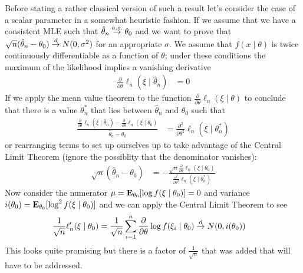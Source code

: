 Before stating a rather classical version of such a result let's consider the
case of a scalar parameter in a somewhat heuristic fashion.  If we
assume that we have a consistent MLE such that $\hat{\theta}_n \toas
\theta_0$ and we want to prove that $\sqrt{n}(\hat{\theta}_n -
\theta_0 ) \todist N(0, \sigma^2)$ for an appropriate $\sigma$.  We assume that $f(x \mid
\theta)$ is twice continuously differentiable as a function of
$\theta$; under these conditions the
maximum of the likelihood implies a vanishing derivative
\begin{align*}
\frac{\partial}{\partial \theta} \ell_n (\xi \mid \hat{\theta}_n) &= 0
\end{align*} 
If we apply the mean value theorem to the function
$\frac{\partial}{\partial \theta} \ell_n (\xi \mid \theta)$ to conclude
that there is a value $\theta^*_n$ that lies between $\hat{\theta}_n$
and $\theta_0$ such that 
\begin{align*}
\frac{\frac{\partial}{\partial \theta} \ell_n (\xi \mid \hat{\theta}_n)
  - \frac{\partial}{\partial \theta} \ell_n (\xi \mid
  \theta_0)}{\hat{\theta}_n - \theta_0} &= \frac{\partial^2}{\partial \theta^2}\ell_n (\xi \mid \theta^*_n)
\end{align*}
or rearranging terms to set up ourselves up to take advantage of the
Central Limit Theorem (ignore the possiblity that the denominator vanishes):
\begin{align*}
\sqrt{n}(\hat{\theta}_n - \theta_0) &=
-\frac{\sqrt{n}
 \frac{\partial}{\partial \theta} \ell_n (\xi \mid
  \theta_0)}{\frac{\partial^2}{\partial \theta^2}\ell_n (\xi \mid \theta^*_n)} 
\end{align*}
Now consider the numerator $\mu = \sexpectation{\log f(\xi \mid
  \theta_0)}{\theta_0} = 0$ and variance $i(\theta_0) = \sexpectation{\log^2 f(\xi \mid
  \theta_0)}{\theta_0}$ and we can apply the Central Limit Theorem to see
\begin{align*}
\frac{1}{\sqrt{n}} \ell^\prime_n (\xi \mid \theta_0) &= \frac{1}{\sqrt{n}}
\sum_{i=1}^n \frac{\partial}{\partial \theta} \log f(\xi_i \mid
\theta_0) \todist N(0, i(\theta_0))
\end{align*}
This looks quite promising but there is a factor of
$\frac{1}{\sqrt{n}}$ that was added that will have to be addressed.

